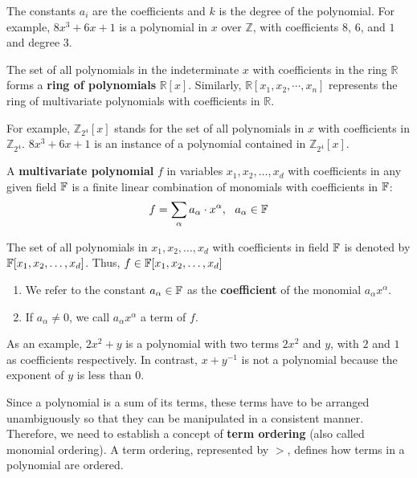 The constants $a_i$ are the coefficients and $k$ is the degree of the polynomial. 
For example, $8x^3 + 6x + 1$ is a polynomial in $x$ over $\mathbb{Z}$, with
coefficients $8$, $6$, and $1$ and degree $3$. 

\begin{Definition}
The set of all polynomials in the indeterminate
$x$ with coefficients in the ring $\mathbb{R}$ forms a {\bf
ring of polynomials} $\mathbb{R}[x]$. 
Similarly, $\mathbb{R}[x_1,x_{2},\cdots, x_{n}]$ 
represents the ring of multivariate polynomials with coefficients in $\mathbb{R}$.
\end{Definition}

For example, $\mathbb{Z}_{2^4}[x]$ stands for the set of all polynomials in
$x$ with coefficients in $\mathbb{Z}_{2^4}$. $8x^3 + 6x + 1$ is an instance 
of a polynomial contained in $\mathbb{Z}_{2^4}[x]$.

\begin{Definition}
A {\bf multivariate polynomial} $f$ in variables $x_1, x_2, \ldots, x_d$ 
with coefficients in any given field ${\mathbb{F}}$ is a finite linear 
combination of monomials with coefficients in ${\mathbb{F}}$: 
\begin{equation}
	f=\sum_{\alpha}a_{\alpha}\cdot x^{\alpha}, ~~a_{\alpha}\in {\mathbb{F}} \nonumber
\end{equation}

The set of all polynomials in $x_1, x_2, \ldots, x_d$ with coefficients in 
field ${\mathbb{F}}$ is denoted by ${\mathbb{F}}[x_1, x_2, \ldots, x_d]$. 
Thus, $f \in {\mathbb{F}}[x_1, x_2, \ldots, x_d]$

\begin{enumerate}
\item We refer to the constant $a_{\alpha} \in {\mathbb{F}}$ as the 
{\bf coefficient} of the monomial $a_{\alpha} x^{\alpha}$.
\item If $a_{\alpha} \neq 0$, we call $a_{\alpha} x^{\alpha}$ a term of $f$.
\end{enumerate}
\end{Definition}

As an example, $2x^2+y$ is a polynomial with two terms $2x^2$ and $y$, with 
$2$ and $1$ as coefficients respectively. 
In contrast, $x+y^{-1}$ is not a polynomial because the exponent of $y$ is 
less than $0$.

Since a polynomial is a sum of its terms,
these terms have to be arranged unambiguously so that they can be 
manipulated in a consistent manner.
Therefore, we need to establish a concept of 
{\bf term ordering} (also called monomial ordering).
A term ordering, represented by $>$, defines how
terms in a polynomial are ordered.

